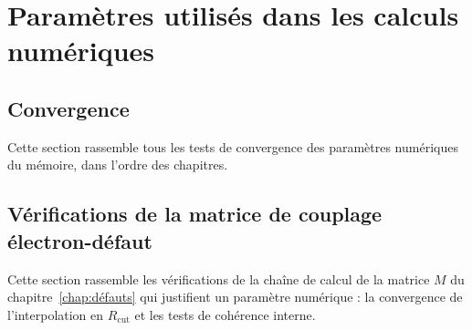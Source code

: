 \chapter{Paramètres utilisés dans les calculs numériques}\label{annexe:paramètres}

\section{Convergence}

Cette section rassemble tous les tests de convergence des paramètres numériques du mémoire, dans l'ordre des chapitres.

\section{Vérifications de la matrice de couplage électron-défaut}\label{sec:annexe_M_tests}

Cette section rassemble les vérifications de la chaîne de calcul de la matrice $M$ du chapitre~\ref{chap:défauts} qui justifient un paramètre numérique : la convergence de l'interpolation en $R_\text{cut}$ et les tests de cohérence interne.


